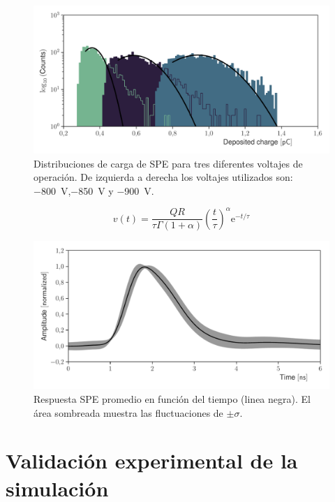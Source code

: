 \begin{figure}
        \centering
        \includegraphics[width=\textwidth]{mapmt_charge.pdf}
        \caption{Distribuciones de carga de SPE para tres diferentes voltajes de operación. De izquierda a derecha los voltajes utilizados son: \SI{-800}{\volt},\SI{-850}{\volt} y \SI{-900}{\volt}.}
        \label{fig:mapmt_charge}
\end{figure}

\begin{equation}
\label{equ:sphe}
v(t)=\frac{QR}{\tau\Gamma(1+\alpha)}\left(\frac{t}{\tau}\right)^{\alpha}\mathrm{e}^{-t/\tau}
\end{equation}

\begin{figure}
        \centering
        \includegraphics[width=\textwidth]{sphe-signal.pdf}
        \caption{Respuesta SPE promedio en función del tiempo (linea negra). El área sombreada muestra las fluctuaciones de $\pm\sigma$.}
        \label{fig:sphe}
\end{figure}

\section{Validación experimental de la simulación}




